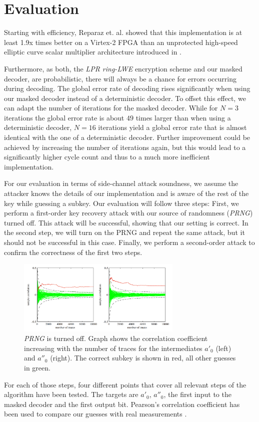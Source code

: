 \section{Evaluation}
Starting with efficiency, Reparaz et. al. showed that this implementation is at least 1.9x times better on a Virtex-2 FPGA than an unprotected high-speed elliptic curve scalar multiplier architecture introduced in \cite{Rebeiro2012}.

Furthermore, as both, the \textit{\ac{LPR} \ac{ring-LWE}} encryption scheme and our masked decoder, are probabilistic, there will always be a chance for errors occurring during decoding. The global error rate of decoding rises significantly when using our masked decoder instead of a deterministic decoder. To offset this effect, we can adapt the number of iterations for the masked decoder. While for \(N=3\) iterations the global error rate is about \(49\) times larger than when using a deterministic decoder, \(N=16\) iterations yield a global error rate that is almost identical with the one of a deterministic decoder. Further improvement could be achieved by increasing the number of iterations again, but this would lead to a significantly higher cycle count and thus to a much more inefficient implementation.

For our evaluation in terms of side-channel attack soundness, we assume the attacker knows the details of our implementation and is aware of the rest of the key while guessing a subkey. Our evaluation will follow three steps: First, we perform a first-order key recovery attack with our source of randomness (\textit{\acs{PRNG}}) turned off. This attack will be successful, showing that our setting is correct. In the second step, we will turn on the PRNG and repeat the same attack, but it should not be successful in this case. Finally, we perform a second-order attack to confirm the correctness of the first two steps.
\begin{figure}[H]
	\centering
	\includegraphics[width=0.7\textwidth]{dpa_1.png}
	\caption{\textit{\acs{PRNG}} is turned off. Graph shows the correlation coefficient increasing with the number of traces for the intermediates \(a'_0\) (left) and \(a''_0\) (right). The correct subkey is shown in red, all other guesses in green. \cite{maskedRing}}
	\label{dpa_1}
\end{figure}
For each of those steps, four different points that cover all relevant steps of the algorithm have been tested. The targets are \(a'_0\), \(a''_0\), the first input to the masked decoder and the first output bit. Pearson's correlation coefficient has been used to compare our guesses with real measurements \cite{Brier2004}.

